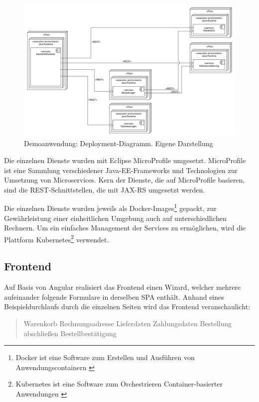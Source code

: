 \begin{figure}[H]
	\centering
	\includegraphics[width=1.00\linewidth]{img/04_erstellung-poc/demoanwendung_deployment.png}
	\caption{Demoanwendung: Deployment-Diagramm. Eigene Darstellung}
	\label{fig:demoanwendung_deployment}
\end{figure}

Die einzelnen Dienste wurden mit Eclipse MicroProfile \cite{EclipseMicroprofile} umgesetzt. MicroProfile ist eine Sammlung verschiedener Java-EE-Frameworks und Technologien zur Umsetzung von Microservices. Kern der Dienste, die auf MicroProfile basieren, sind die REST-Schnittstellen, die mit JAX-RS umgesetzt werden.

Die einzelnen Dienste wurden jeweils als Docker-Images\footnote{Docker \cite{Docker} ist eine Software zum Erstellen und Ausführen von Anwendungscontainern \cite{PatternsForSoftwareOrchestration}} gepackt, zur Gewährleistung einer einheitlichen Umgebung auch auf unterschiedlichen Rechnern. Um ein einfaches Management der Services zu ermöglichen, wird die Plattform Kubernetes\footnote{Kubernetes \cite{Kubernetes} ist eine Software zum Orchestrieren Container-basierter Anwendungen \cite{KeyCharacteristicsOfAContainerOrchestrationPlatform}} verwendet.

\subsection{Frontend}

Auf Basis von Angular realisiert das Frontend einen Wizard, welcher mehrere aufeinander folgende Formulare in derselben SPA enthält. Anhand eines Beispieldurchlaufs durch die einzelnen Seiten wird das Frontend veranschaulicht:

\begin{quotation}
	Warenkorb \textrightarrow{} Rechnungsadresse \textrightarrow{} Lieferdaten \textrightarrow{} Zahlungsdaten
	 \textrightarrow{} Bestellung abschließen \textrightarrow{} Bestellbestätigung
\end{quotation}

